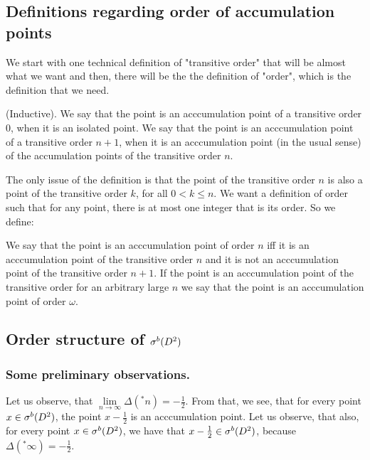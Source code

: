 \subsection{Definitions regarding order of accumulation points}
\label{accumulation_points_definitions} 
We start with one technical definition of "transitive order" that will be almost what we want
and then, there will be the the definition of "order", which is the definition that we need. \\ 
\begin{definition}
(Inductive). 
We say that the point is an acccumulation point of a transitive order $0$, when it is 
an isolated point. 
We say that the point is an acccumulation point of a transitive order $n + 1$, when it is 
an acccumulation point (in the usual sense) of the accumulation points of the transitive order $n$. 
\end{definition}  
The only issue of the definition is that the point of the transitive order $n$ is also a point 
of the transitive order $k$, for all $0< k \leq n$. We want a definition of order such that 
for any point, there is at most one integer that is its order. So we define:
\begin{definition}
We say that the point is an acccumulation point of order $n$ iff it is an acccumulation point 
of the transitive order $n$ and it is not an acccumulation point of the transitive order $n+1$. 
If the point is an acccumulation point of the transitive order for an arbitrary large $n$ we say that 
the  point is an acccumulation point of order $\omega$.
\end{definition}

\subsection{Order structure of ${\mathcal{\sigma}^b(D^2)}$}
\subsubsection{Some preliminary observations.}
Let us observe, that $\lim\limits_{n \to \infty} \Delta(^*n) = -\frac{1}{2}$. From that, we see, 
that for every point $x \in {\mathcal{\sigma}^b(D^2)}$, the point $x - \frac{1}{2}$ is an acccumulation point. 
Let us observe, that also, for every point $x \in {\mathcal{\sigma}^b(D^2)}$, we have that $x - \frac{1}{2} \in {\mathcal{\sigma}^b(D^2)}$, 
because $\Delta(^*\infty) = -\frac{1}{2}$. \\

